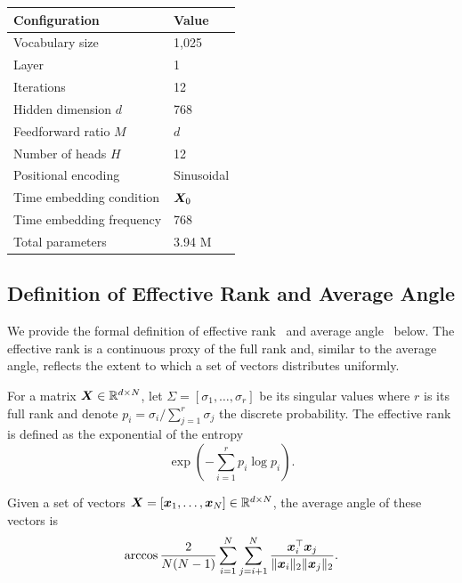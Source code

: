 \begin{table}[htbp]
\begin{minipage}[t]{0.49\textwidth}
\begin{tabular}{ll}
            \toprule
            \textbf{Configuration}  & \textbf{Value} \\
            \midrule
            Vocabulary size & 1{,}025 \\
            Layer  &  1 \\
            Iterations & 12 \\
            Hidden dimension $d$ & 768 \\
            Feedforward ratio $M$ & $d$ \\
            Number of heads $H$ & 12 \\
            Positional encoding & Sinusoidal \\
            Time embedding condition & ${\bm{X}}_0$ \\
            Time embedding frequency & 768 \\
            \midrule
            Total parameters & 3.94 M \\
            \bottomrule
        \end{tabular}
    \end{minipage}
\end{table}

\subsection{Definition of Effective Rank and Average Angle}
\label{section:definition}
We provide the formal definition of effective rank~ and average angle~ below. The effective rank is a continuous proxy of the full rank and, similar to the average angle, reflects the extent to which a set of vectors distributes uniformly. 
\begin{definition}
\label{definition:effective rank}
For a matrix ${\bm{X}} \in \mathbb{R}^{d\times N}$, let $\Sigma=[\sigma_1,\dots,\sigma_r]$ be its singular values where $r$ is its full rank and denote $p_i = \sigma_i / \sum_{j=1}^r \sigma_j$ the discrete probability. The effective rank \citep{roy2007effective,guo2023contranorm} is defined as the exponential of the entropy 
\begin{equation}
\label{eq:13}
\exp(-\sum_{i=1}^r p_i \log p_i).
\end{equation}
\end{definition}

\begin{definition}
\label{definition:average angle}
Given a set of vectors ${\bm{X}} = [{\bm{x}}_1, \dots, {\bm{x}}_N] \in \mathbb{R}^{d\times N}$, the average angle of these vectors is 
\begin{equation}
\label{eq:14}
\operatorname{arccos} \frac{2}{N(N-1)}\sum_{i=1}^N\sum_{j=i+1}^{N}\frac{{\bm{x}}_i^\top{\bm{x}}_j}{\|{\bm{x}}_i\|_2\|{\bm{x}}_j\|_2}.
\end{equation}
\end{definition}

